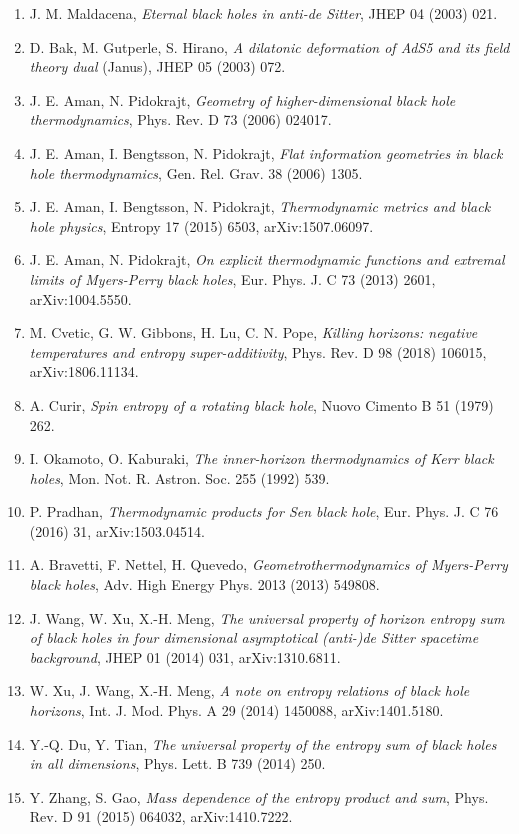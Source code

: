 \documentclass[11pt]{article}
\begin{document}
\begin{enumerate}
\item J. M. Maldacena, \emph{Eternal black holes in anti-de Sitter}, JHEP 04 (2003) 021.
\item D. Bak, M. Gutperle, S. Hirano, \emph{A dilatonic deformation of AdS5 and its field theory dual} (Janus), JHEP 05 (2003) 072.
\item J. E. Aman, N. Pidokrajt, \emph{Geometry of higher-dimensional black hole thermodynamics}, Phys. Rev. D 73 (2006) 024017.
\item J. E. Aman, I. Bengtsson, N. Pidokrajt, \emph{Flat information geometries in black hole thermodynamics}, Gen. Rel. Grav. 38 (2006) 1305.
\item J. E. Aman, I. Bengtsson, N. Pidokrajt, \emph{Thermodynamic metrics and black hole physics}, Entropy 17 (2015) 6503, arXiv:1507.06097.
\item J. E. Aman, N. Pidokrajt, \emph{On explicit thermodynamic functions and extremal limits of Myers-Perry black holes}, Eur. Phys. J. C 73 (2013) 2601, arXiv:1004.5550.
\item M. Cvetic, G. W. Gibbons, H. Lu, C. N. Pope, \emph{Killing horizons: negative temperatures and entropy super-additivity}, Phys. Rev. D 98 (2018) 106015, arXiv:1806.11134.
\item A. Curir, \emph{Spin entropy of a rotating black hole}, Nuovo Cimento B 51 (1979) 262.
\item I. Okamoto, O. Kaburaki, \emph{The inner-horizon thermodynamics of Kerr black holes}, Mon. Not. R. Astron. Soc. 255 (1992) 539.
\item P. Pradhan, \emph{Thermodynamic products for Sen black hole}, Eur. Phys. J. C 76 (2016) 31, arXiv:1503.04514.
\item A. Bravetti, F. Nettel, H. Quevedo, \emph{Geometrothermodynamics of Myers-Perry black holes}, Adv. High Energy Phys. 2013 (2013) 549808.
\item J. Wang, W. Xu, X.-H. Meng, \emph{The universal property of horizon entropy sum of black holes in four dimensional asymptotical (anti-)de Sitter spacetime background}, JHEP 01 (2014) 031, arXiv:1310.6811.
\item W. Xu, J. Wang, X.-H. Meng, \emph{A note on entropy relations of black hole horizons}, Int. J. Mod. Phys. A 29 (2014) 1450088, arXiv:1401.5180.
\item Y.-Q. Du, Y. Tian, \emph{The universal property of the entropy sum of black holes in all dimensions}, Phys. Lett. B 739 (2014) 250.
\item Y. Zhang, S. Gao, \emph{Mass dependence of the entropy product and sum}, Phys. Rev. D 91 (2015) 064032, arXiv:1410.7222.

\end{enumerate}
\end{document}
